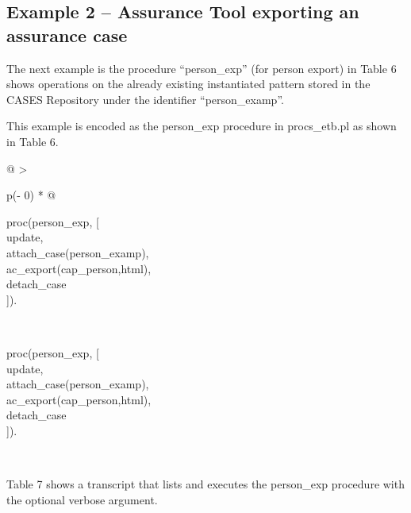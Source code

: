 \documentclass[12pt,twoside,a4paper]{article}
\begin{document}
\hypertarget{example-2-assurance-tool-exporting-an-assurance-case}{%
\subsection{Example 2 -- Assurance Tool exporting an assurance case}\label{example-2-assurance-tool-exporting-an-assurance-case}}

The next example is the procedure ``person\_exp'' (for person export) in Table 6 shows operations on the already existing instantiated pattern stored in the CASES Repository under the identifier ``person\_examp''.

This example is encoded as the person\_exp procedure in procs\_etb.pl as shown in Table 6.

\begin{longtable}[]{@{}
  >{\raggedright\arraybackslash}p{(\columnwidth - 0\tabcolsep) * }@{}}
\caption{\protect\hypertarget{_Ref168411722}{}{}Table Example 2 -- exporting an assurance case as HTML}\tabularnewline
\toprule
\begin{minipage}[b]{\linewidth}\raggedright
proc(person\_exp, {[}\\
update,\\
attach\_case(person\_examp),\\
ac\_export(cap\_person,html),\\
detach\_case\\
{]}).\strut
\end{minipage} \\
\midrule
\endfirsthead
\toprule
\begin{minipage}[b]{\linewidth}\raggedright
proc(person\_exp, {[}\\
update,\\
attach\_case(person\_examp),\\
ac\_export(cap\_person,html),\\
detach\_case\\
{]}).\strut
\end{minipage} \\
\midrule
\endhead
\bottomrule
\end{longtable}

Table 7 shows a transcript that lists and executes the person\_exp procedure with the optional verbose argument.
\end{document}
